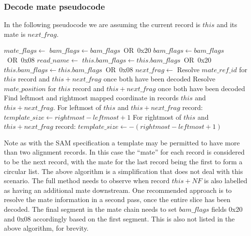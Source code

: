 \documentclass[a4paper]{article}
\begin{document}
\subsubsection*{\textbf{Decode mate pseudocode}}

In the following pseudocode we are assuming the current record is $this$ and its mate is $next\_frag$.

\begin{algorithmic}[1]
  \State $mate\_flags\gets $ 
    \State $bam\_flags\gets bam\_flags$\ OR\ 0x20
  \EndIf
    \State $bam\_flags\gets bam\_flags$\ OR\ 0x08
  \EndIf
    \State $read\_name \gets$ 
  \EndIf
\settowidth{\maxwidth}{mate\_position\ }
\State {}  
\State {} 
\State {} 
    \State $this.bam\_flags \gets this.bam\_flags$\ OR\ 0x20
  \EndIf
    \State $this.bam\_flags \gets this.bam\_flags$\ OR\ 0x08
  \EndIf
  \State $next\_frag\gets$ 
  \State Resolve $mate\_ref\_id$ for $this$ record and $this+next\_frag$ once both have been decoded
  \State Resolve $mate\_position$ for $this$ record and $this+next\_frag$ once both have been decoded
  \State Find leftmost and rightmost mapped coordinate in records $this$ and $this+next\_frag$.
  \State For leftmost of $this$ and $this+next\_frag$ record: $template\_size\gets rightmost-leftmost+1$
  \State For rightmost of $this$ and $this+next\_frag$ record: $template\_size\gets -(rightmost-leftmost+1)$
\EndIf
\EndProcedure
\end{algorithmic}

Note as with the SAM specification a template may be permitted to have more than two alignment records.
In this case the ``mate'' for each record is considered to be the next record, with the mate for the last record being the first to form a circular list.
The above algorithm is a simplification that does not deal with this scenario.
The full method needs to observe when record $this+NF$ is also labelled as having an additional mate downstream.
One recommended approach is to resolve the mate information in a second pass, once the entire slice has been decoded.
The final segment in the mate chain needs to set $bam\_flags$ fields 0x20 and 0x08 accordingly based on the first segment.
This is also not listed in the above algorithm, for brevity.
\end{document}
